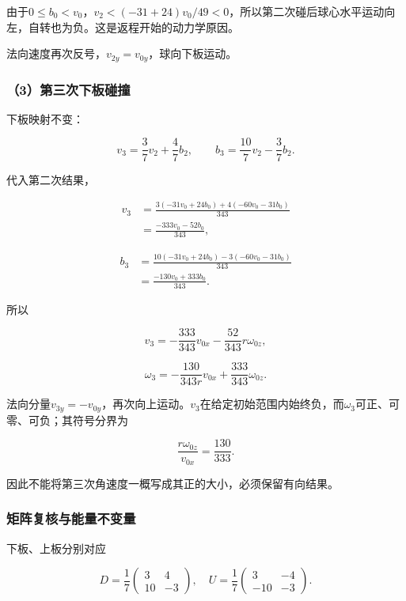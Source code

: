 \documentclass[12pt,a4paper,fontset=fandol]{ctexart}
\begin{document}
由于\(0\leq b_0<v_0\)，\(v_2<(-31+24)v_0/49<0\)，所以第二次碰后球心水平运动向左，自转也为负。这是返程开始的动力学原因。

法向速度再次反号，\(v_{2y}=v_{0y}\)，球向下板运动。

\subsubsection{（3）第三次下板碰撞}\label{ux7b2cux4e09ux6b21ux4e0bux677fux78b0ux649e}

下板映射不变：

\[
v_3=\frac37v_2+\frac47b_2,\qquad
b_3=\frac{10}{7}v_2-\frac37b_2.
\]

代入第二次结果，

\[
\begin{aligned}
v_3
&=\frac{3(-31v_0+24b_0)+4(-60v_0-31b_0)}{343}\\
&=\frac{-333v_0-52b_0}{343},
\end{aligned}
\]

\[
\begin{aligned}
b_3
&=\frac{10(-31v_0+24b_0)-3(-60v_0-31b_0)}{343}\\
&=\frac{-130v_0+333b_0}{343}.
\end{aligned}
\]

所以

\[
\boxed{v_3=-\frac{333}{343}v_{0x}
-\frac{52}{343}r\omega_{0z}},
\]

\[
\boxed{\omega_3=-\frac{130}{343r}v_{0x}
+\frac{333}{343}\omega_{0z}}.
\]

法向分量\(v_{3y}=-v_{0y}\)，再次向上运动。\(v_3\)在给定初始范围内始终负，而\(\omega_3\)可正、可零、可负；其符号分界为

\[
\frac{r\omega_{0z}}{v_{0x}}=\frac{130}{333}.
\]

因此不能将第三次角速度一概写成其正的大小，必须保留有向结果。

\subsubsection{矩阵复核与能量不变量}\label{ux77e9ux9635ux590dux6838ux4e0eux80fdux91cfux4e0dux53d8ux91cf}

下板、上板分别对应

\[
D=\frac17\begin{pmatrix}3&4\\10&-3\end{pmatrix},
\quad
U=\frac17\begin{pmatrix}3&-4\\-10&-3\end{pmatrix}.
\]
\end{document}
